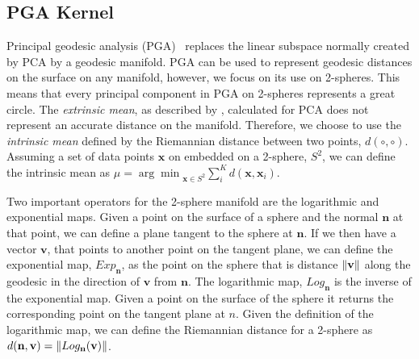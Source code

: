 \subsection{PGA Kernel}\label{subsec:singl_img_pga_kernel}
Principal geodesic analysis (PGA)~\cite{fletcher2004principal,smith2008facial} replaces the
linear subspace normally created by PCA by a geodesic manifold. PGA can be used
to represent geodesic distances on the surface on any manifold, however, we
focus on its use on 2-spheres. This means that every principal component in PGA
on 2-spheres represents a great circle. The \textit{extrinsic mean}, as
described by \citet{pennec2006intrinsic}, calculated for PCA does not represent
an accurate distance on the manifold. Therefore, we choose to use the
\textit{intrinsic mean} defined by the Riemannian distance between two points,
$d(\circ,\circ)$. Assuming a set of data points $\mathbf{x}$ on embedded on
a 2-sphere, $S^2$, we can define the intrinsic mean as $\mu =
{\arg\min}_{\mathbf{x} \in S^2} \sum_i^K d(\mathbf{x},
\mathbf{x}_i)$.

Two important operators for the 2-sphere manifold are the logarithmic and
exponential maps. Given a point on the surface of a sphere and the normal
$\mathbf{n}$ at that point, we can define a plane tangent to the sphere at
$\mathbf{n}$. If we then have a vector $\mathbf{v}$, that points to
another point on the tangent plane, we can define the exponential map,
$Exp_{\mathbf{n}}$, as the point on the sphere that is distance
$\lVert{} \mathbf{v} \rVert$ along the geodesic in the direction of $\mathbf{v}$
from $\mathbf{n}$. The logarithmic map, $Log_{\mathbf{n}}$ is the
inverse of the exponential map. Given a point on the surface of the sphere it
returns the corresponding point on the tangent plane at $n$. Given the
definition of the logarithmic map, we can define the Riemannian distance for a
2-sphere as $d(\mathbf{n}, \mathbf{v}) = \lVert{} Log_{\mathbf{n}}(\mathbf{v}) \rVert$.

